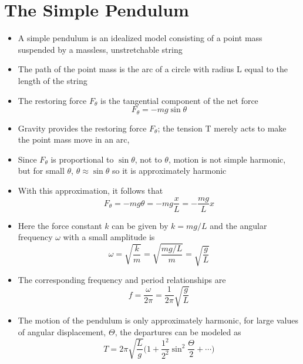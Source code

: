 \documentclass[11pt, a4paper]{article}
\begin{document}
\section{The Simple Pendulum}
\begin{itemize}
    \item A simple pendulum is an idealized model consisting of a point mass suspended by a
        massless, unstretchable string
    \item The path of the point mass is the arc of a circle with radius L equal to the
        length of the string
    \item The restoring force $F_{\theta}$ is the tangential component of the net force
        \begin{equation}
            F_{\theta} = -mg\sin\theta
        \end{equation}
    \item Gravity provides the restoring force $F_\theta$; the tension T merely acts to
        make the point mass move in an arc,
    \item Since $F_\theta$ is proportional to $\sin\theta$, not to $\theta$, motion is not
        simple harmonic, but for small $\theta$, $\theta \approx \sin\theta$ so it is
        approximately harmonic
    \item With this approximation, it follows that
        \begin{equation}
            F_{\theta} = -mg\theta = -mg\frac{x}{L} = -\frac{mg}{L}x
        \end{equation}
    \item Here the force constant $k$ can be given by $k = mg/L$ and the angular frequency
        $\omega$ with a small amplitude is
        \begin{equation}
            \omega = \sqrt{\frac{k}{m}} = \sqrt{\frac{mg/L}{m}} = \sqrt{\frac{g}{L}}
        \end{equation}
    \item The corresponding frequency and period relationships are
        \begin{equation}
            f = \frac{\omega}{2\pi} = \frac{1}{2\pi}\sqrt{\frac{g}{L}}
        \end{equation}
    \item The motion of the pendulum is only approximately harmonic, for large values of
        angular displacement, $\Theta$, the departures can be modeled as
        \begin{equation}
            T = 2\pi\sqrt{\frac{L}{g}}\bigg(1 + \frac{1^{2}}{2^{2}}\sin^{2}\frac{\Theta}{2}
            + \cdots\bigg)
        \end{equation}
\end{itemize}
\end{document}
